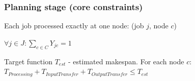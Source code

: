 \documentclass{beamer}
\begin{document}
\begin{frame}\frametitle{Planning stage (core constraints)}
\vspace{-5mm}
		\begin{block}{Each job processed exactly at one node: (job $j$, node $c$)}
	 	
		\begin{center}
					$\forall j \in J: \sum \limits_{c \in C} Y_{jc} = 1$ 	
		\end{center}	
	
		\end{block}
	\begin{block}{Target function $T_{est}$  - estimated makespan.  }
	For each node $c$:
	$T_{Processing} + T_{InputTransfer} + T_{OutputTransfer} \leq T_{est}$
	\end{block}
	

\end{frame}
\end{document}
